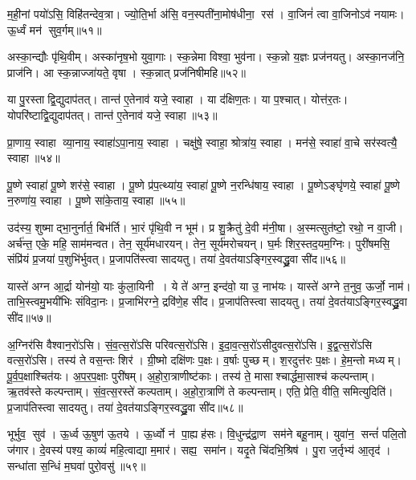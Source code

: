 म॒ही॒नां पयो॑ऽसि॒ विहि॑तन्देव॒त्रा। ज्यो॒ति॒र्भा अ॑सि॒ वन॒स्पती॑ना॒\-मोष॑धीना॒ रस॑। वा॒जिनं॑ त्वा वा॒जिनोऽव॑ नयामः। ऊ॒र्ध्वं मन॑ सुव॒र्गम्॥५१॥
\anuvakamend

अस्का॒न्द्यौः पृ॑थि॒वीम्। अस्का॑नृष॒भो युवा॒गाः। स्क॒न्नेमा विश्वा॒ भुव॑ना। स्क॒न्नो य॒ज्ञः प्रज॑नयतु। अस्का॒नज॑नि॒ प्राज॑नि। आ स्क॒न्नाज्जा॑यते॒ वृषा। स्क॒न्नात् प्रज॑निषीमहि॥५२॥
\anuvakamend

या पु॒रस्ताद्वि॒द्युदाप॑तत्। तान्त॑ ए॒तेनाव॑ यजे॒ स्वाहा। या द॑क्षिण॒तः। या प॒श्चात्। योत्त॑र॒तः। योपरि॑ष्टाद्वि॒द्युदाप॑तत्। तान्त॑ ए॒तेनाव॑ यजे॒ स्वाहा॥५३॥
\anuvakamend

प्रा॒णाय॒ स्वाहा व्या॒नाय॒ स्वाहा॑ऽपा॒नाय॒ स्वाहा। चक्षु॑षे॒ स्वाहा॒ श्रोत्रा॑य॒ स्वाहा। मन॑से॒ स्वाहा॑ वा॒चे सर॑स्वत्यै॒ स्वाहा॥५४॥
\anuvakamend

पू॒ष्णे स्वाहा॑ पू॒ष्णे शर॑से॒ स्वाहा। पू॒ष्णे प्र॑प॒त्थ्या॑य॒ स्वाहा॑ पू॒ष्णे न॒रन्धि॑षाय॒ स्वाहा। पू॒ष्णेऽङ्घृ॑णये॒ स्वाहा॑ पू॒ष्णे न॒रुणा॑य॒ स्वाहा। पू॒ष्णे सा॑के॒ताय॒ स्वाहा॥५५॥
\anuvakamend


उद॑स्य॒ शुष्माद्भा॒नुर्नार्त॒ बिभ॑र्ति। भा॒रं पृ॑थि॒वी न भूम॑। प्र शु॒क्रैतु॑ दे॒वी म॑नी॒षा। अ॒स्मत्सुत॑ष्टो॒ रथो॒ न वा॒जी। अर्च॑न्त॒ एके॒ महि॒ साम॑मन्वत। तेन॒ सूर्य॑मधारयन्। तेन॒ सूर्य॑मरोचयन्। घ॒र्मः  शिर॒स्तद॒यम॒ग्निः। पुरी॑षमसि॒ संप्रि॑यं प्र॒जया॑ प॒शुभि॑र्भुवत्। प्र॒जापति॑स्त्वा सादयतु। तया॑ दे॒वत॑याऽङ्गिर॒स्वद्ध्रु॒वा सी॑द॥५६॥
\anuvakamend

यास्ते॑ अग्न आ॒र्द्रा योन॑यो॒ याः कु॑ला॒यिनी। ये ते॑ अग्न॒ इन्द॑वो॒ या उ॒ नाभ॑यः। यास्ते॑ अग्ने त॒नुव॒ ऊर्जो॒ नाम॑। ताभि॒स्त्वमु॒भयी॑भिः संविदा॒नः। प्र॒जाभि॑रग्ने॒ द्रवि॑णे॒ह सी॑द। प्र॒जाप॑तिस्त्वा सादयतु। तया॑ दे॒वत॑याऽङ्गिर॒स्वद्ध्रु॒वा सी॑द॥५७॥
\anuvakamend

अ॒ग्निर॑सि वैश्वान॒रो॑ऽसि। सं॒व॒त्स॒रो॑ऽसि परिवत्स॒रो॑ऽसि। इ॒दा॒व॒त्स॒रो॑ऽसीदुवत्स॒रो॑ऽसि। इ॒द्व॒त्स॒रो॑ऽसि वत्स॒रो॑ऽसि। तस्य॑ ते वस॒न्तः  शिर॑। ग्री॒ष्मो दक्षि॑णः प॒क्षः। व॒र्\mbox{}षाः पुच्छम्। श॒रदुत्त॑रः प॒क्षः। हे॒म॒न्तो मध्यम्। पू॒र्व॒प॒क्षाश्चित॑यः। अ॒प॒र॒प॒क्षाः पुरी॑षम्। अ॒हो॒रा॒त्राणीष्ट॑काः। तस्य॑ ते॒ मासाश्चार्द्धमा॒साश्च॑ कल्पन्ताम्। ऋ॒तव॑स्ते कल्पन्ताम्। सं॒व॒त्स॒रस्ते॑ कल्पताम्। अ॒हो॒रा॒त्राणि॑ ते कल्पन्ताम्। एति॒ प्रेति॒ वीति॒ समित्युदिति॑। प्र॒जाप॑तिस्त्वा सादयतु। तया॑ दे॒वत॑याऽङ्गिर॒स्वद्ध्रु॒वा सी॑द॥५८॥
\anuvakamend[चित॑यो॒ नव॑ च]


भूर्भुव॒ सुव॑। ऊ॒र्ध्व ऊ॒षुण॑ ऊ॒तये। ऊ॒र्ध्वो न॑ पा॒ह्यह॑सः। वि॒धुन्द्र॑द्रा॒ण सम॑ने बहू॒नाम्। युवा॑न॒ सन्तं॑ पलि॒तो ज॑गार। दे॒वस्य॑ पश्य॒ काव्यं॑ महि॒त्वाद्या म॒मार॑। सह्य॒ समा॑न। यदृ॒ते चि॑दभि॒श्रिष॑। पु॒रा ज॒र्तृभ्य॑ आ॒तृद॑। सन्धा॑ता स॒न्धिं म॒घवा॑ पुरो॒वसु॑॥५९॥

